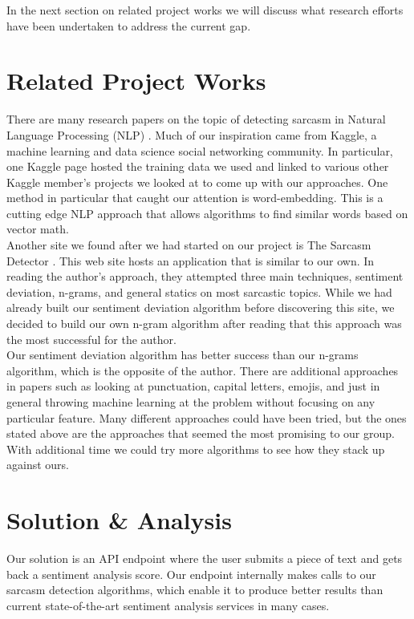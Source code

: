 \documentclass[conference]{IEEEtran}
\begin{document}
In the next section on related project works we will discuss what research efforts have been undertaken to address the current gap.\\

\section{Related Project Works}
There are many research papers on the topic of detecting sarcasm in Natural Language Processing (NLP) \cite{b3} \cite{b4}. Much of our inspiration came from Kaggle, a machine learning and data science social networking community. In particular, one Kaggle page \cite{b1} hosted the training data we used and linked to various other Kaggle member’s projects we looked at to come up with our approaches. One method in particular that caught our attention is word-embedding. This is a cutting edge NLP approach that allows algorithms to find similar words based on vector math. \\

Another site we found after we had started on our project is The Sarcasm Detector \cite{b2}. This web site hosts an application that is similar to our own. In reading the author's approach, they attempted three main techniques, sentiment deviation, n-grams, and general statics on most sarcastic topics. While we had already built our sentiment deviation algorithm before discovering this site, we decided to build our own n-gram algorithm after reading that this approach was the most successful for the author.\\
Our sentiment deviation algorithm has better success than our n-grams algorithm, which is the opposite of the author. There are additional approaches in papers such as looking at punctuation, capital letters, emojis, and just in general throwing machine learning at the problem without focusing on any particular feature. Many different approaches could have been tried, but the ones stated above are the approaches that seemed the most promising to our group. With additional time we could try more algorithms to see how they stack up against ours.\\

\section{Solution \& Analysis}
Our solution is an API endpoint where the user submits a piece of text and gets back a sentiment analysis score. Our endpoint internally makes calls to our sarcasm detection algorithms, which enable it to produce better results than current state-of-the-art sentiment analysis services in many cases. \\
\end{document}

